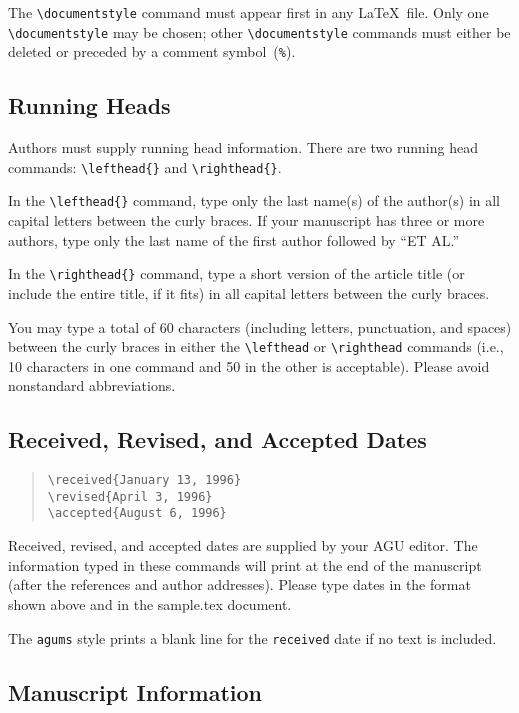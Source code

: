 \begin{article}
\noindent The \verb"\documentstyle" command must appear 
first in any \LaTeX\ file.  Only one \verb"\documentstyle" 
may be chosen; other \verb"\documentstyle" commands must 
either be deleted or preceded by a comment symbol~({\tt \%}).


\subsection{Running Heads}

Authors must supply running head information.
There are two running head commands: \verb"\lefthead{}" 
and \verb"\righthead{}".

In the \verb"\lefthead{}" command, type only the last 
name(s) of the author(s) in all capital letters between 
the curly braces.  If your manuscript has three or 
more authors, type only the last name of the first author 
followed by ``ET AL.''

In the \verb"\righthead{}" command, type a short version of 
the article title (or include the entire title, if it fits) 
in all capital letters between the curly braces.

You may type a total of 60 characters (including letters, 
punctuation, and spaces) between the curly braces in 
either the \verb"\lefthead" or \verb"\righthead" commands 
(i.e., 10 characters in one command and 50 in the other 
is acceptable).  Please avoid nonstandard abbreviations.


\subsection{Received, Revised, and Accepted Dates}

\begin{quote}
\verb"\received{January 13, 1996}"\\
\verb"\revised{April 3, 1996}"\\
\verb"\accepted{August 6, 1996}"
\end{quote}

Received, revised, and accepted dates are supplied by 
your AGU editor.  The information typed in these commands 
will print at the end of the manuscript (after the 
references and author addresses).  Please type dates 
in the format shown above and in the sample.tex document.

The {\tt agums} style prints a blank line for the 
{\tt received} date if no text is included.


\subsection{Manuscript Information}


\end{article}
